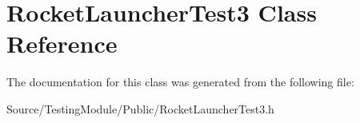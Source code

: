 \hypertarget{class_rocket_launcher_test3}{}\section{Rocket\+Launcher\+Test3 Class Reference}
\label{class_rocket_launcher_test3}


The documentation for this class was generated from the following file\+:\begin{DoxyCompactItemize}
\item 
Source/\+Testing\+Module/\+Public/Rocket\+Launcher\+Test3.\+h\end{DoxyCompactItemize}

